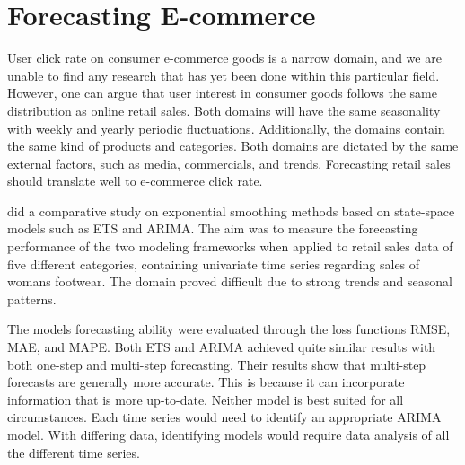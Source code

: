 \section{Forecasting E-commerce}
\label{section:RelatedWork:forecasting-ecommerce}

User click rate on consumer e-commerce goods is a narrow domain,
and we are unable to find any research that has yet been done within this particular field.
However, one can argue that user interest in consumer goods follows the same distribution
as online retail sales.
Both domains will have the same seasonality with weekly and yearly periodic fluctuations.
Additionally, the domains contain the same kind of products and categories.
Both domains are dictated by the same external factors, such as media, commercials,
and trends.
Forecasting retail sales should translate well to e-commerce click rate.


\cite{Ramos2015} did a comparative study on exponential smoothing methods
based on state-space models such as ETS and ARIMA.
The aim was to measure the forecasting performance of the two modeling frameworks
when applied to retail sales data of five different categories,
containing univariate time series regarding sales of womans footwear.
The domain proved difficult due to strong trends and seasonal patterns.

The models forecasting ability were evaluated through the loss functions RMSE, MAE, and MAPE.
Both ETS and ARIMA achieved quite similar results with both one-step and multi-step forecasting.
Their results show that multi-step forecasts are generally more accurate.
This is because it can incorporate information that is more up-to-date.
Neither model is best suited for all circumstances.
Each time series would need to identify an appropriate ARIMA model.
With differing data, identifying models would require data analysis of all the different time series.




